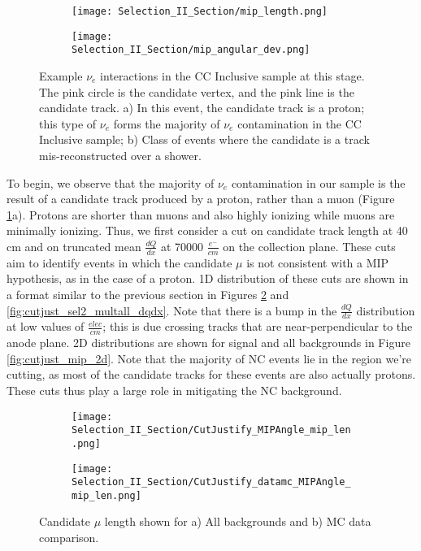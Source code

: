 \begin{figure}[h!]
\centering
  \begin{subfigure}[t]{0.6\textwidth}
    \centering
\texttt{[image: Selection\_II\_Section/mip\_length.png]}
    \caption{ }
  \end{subfigure} 
  \hspace{20mm}
  \begin{subfigure}[t]{0.8\textwidth}
    \centering
\texttt{[image: Selection\_II\_Section/mip\_angular\_dev.png]}
    \caption{ }
  \end{subfigure} 
\caption{ Example $\nu_e$ interactions in the CC Inclusive sample at this stage.  The pink circle is the candidate vertex, and the pink line is the candidate track. a) In this event, the candidate track is a proton; this type of $\nu_e$ forms the majority of $\nu_e$ contamination in the CC Inclusive sample; b) Class of events where the candidate is a track mis-reconstructed over a shower. }
\label{fig:mip_ex_len_angular}
\end{figure}


\par To begin, we observe that the majority of $\nu_e$ contamination in our sample is the result of a candidate track produced by a proton, rather than a muon (Figure \ref{fig:mip_ex_len_angular}a). Protons are shorter than muons and also highly ionizing while muons are minimally ionizing. Thus, we first consider a cut on candidate track length at 40 cm and on truncated mean $\frac{dQ}{dx}$ at 70000 $\frac{e^-}{cm}$ on the collection plane. These cuts aim to identify events in which the candidate $\mu$ is not consistent with a MIP hypothesis, as in the case of a proton. 1D distribution of these cuts are shown in a format similar to the previous section in Figures \ref{fig:cutjust_sel2_multall_len} and \ref{fig:cutjust_sel2_multall_dqdx}. Note that there is a bump in the $\frac{dQ}{dx}$ distribution at low values of $\frac{elec}{cm}$; this is due crossing tracks that are near-perpendicular to the anode plane.  2D distributions are shown for signal and all backgrounds in Figure \ref{fig:cutjust_mip_2d}.  Note that the majority of NC events lie in the region we're cutting, as most of the candidate tracks for these events are also actually protons. These cuts thus play a large role in mitigating the NC background.

\begin{figure}[h!]
\centering
  \begin{subfigure}[t]{0.3\textwidth}
    \centering
\texttt{[image: Selection\_II\_Section/CutJustify\_MIPAngle\_mip\_len.png]}
    \caption{ }
  \end{subfigure} 
  \hspace{20mm}
  \begin{subfigure}[t]{0.3\textwidth}
    \centering
\texttt{[image: Selection\_II\_Section/CutJustify\_datamc\_MIPAngle\_mip\_len.png]}
    \caption{ }
  \end{subfigure} 

\caption{ Candidate $\mu$ length shown for a) All backgrounds and b) MC data comparison. }
\label{fig:cutjust_sel2_multall_len}
\end{figure}


